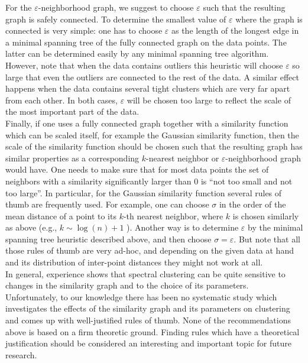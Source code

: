 \documentclass{article}
\newcommand{\eps}{\ensuremath{\varepsilon}}
\begin{document}
For the $\eps$-neighborhood graph, we suggest to choose $\eps$ such
that the resulting graph is safely connected. To determine the
smallest value of $\eps$ where the graph is connected is very simple:
one has to choose $\eps$ as the length of the longest edge in a
minimal spanning tree of the fully connected graph on the data
points. The latter can be determined easily by any minimal spanning
tree algorithm. However, note that when the data contains outliers
this heuristic will choose $\eps$ so large that even the outliers are
connected to the rest of the data. A similar effect happens when the
data contains several tight clusters which are very far apart from
each other. In both cases, $\eps$ will be chosen too large to reflect
the scale of the most important part of the data. \\


Finally, if one uses a fully connected graph together with a similarity
function which can be scaled itself, for example the Gaussian
similarity function, then the scale of the similarity function should
be chosen such that the resulting graph has similar properties as a
corresponding $k$-nearest neighbor or $\eps$-neighborhood graph would
have. One needs to make sure that for most data points the set of
neighbors with a similarity significantly larger than 0 is ``not too
small and not too large''. In particular, for the Gaussian similarity
function several rules of thumb are frequently used. For example, one
can choose $\sigma$ in the order of the mean distance of a point to
its $k$-th nearest neighbor, where $k$ is chosen similarly as above
(e.g., $k \sim \log(n) + 1 $ ). Another way is to determine $\eps$ by the
minimal spanning tree heuristic described above, and then choose
$\sigma = \eps$. But note that all those rules of thumb are
very ad-hoc, and depending on the given data at hand and its
distribution of inter-point distances they might not work at all.\\



In general, experience shows that spectral clustering can be quite
sensitive to changes in the similarity graph and to the choice of its
parameters.  Unfortunately, to our knowledge there has been no
systematic study which investigates the effects of the similarity
graph and its parameters on clustering and comes up with
well-justified rules of thumb. None of the recommendations above is
based on a firm theoretic ground. Finding rules which have a
theoretical justification should be considered an interesting and
important topic for future research. \\
\end{document}
